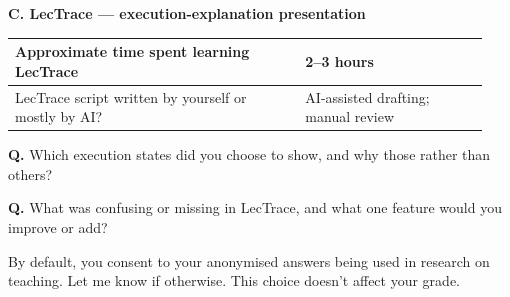 \noindent\textbf{C. LecTrace --- execution-explanation presentation}
\par\smallskip
\noindent\begin{tabular}{|p{0.58\linewidth}|p{0.36\linewidth}|}\hline
Approximate time spent learning LecTrace & 2--3 hours \\\hline
LecTrace script written by yourself or mostly by AI? & AI-assisted drafting; manual review \\\hline
\end{tabular}
\par\medskip\noindent\textbf{Q.} Which execution states did you choose to show, and why those rather than others?
\par\vspace{0.4in}
\noindent\textbf{Q.} What was confusing or missing in LecTrace, and what one feature would you improve or add?
\par\vspace{0.4in}
\noindent By default, you consent to your anonymised answers being used in research on teaching. Let me know if otherwise. This choice doesn't affect your grade.
\endgroup
\clearpage\restoregeometry
